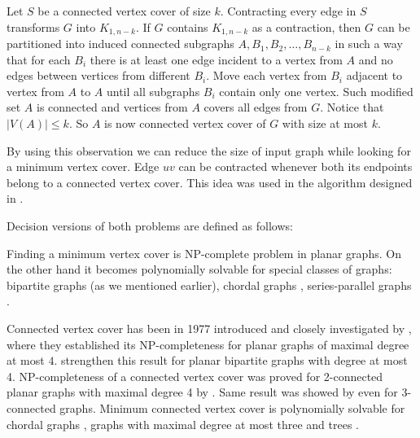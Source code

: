 \begin{myproof}
	Let \(S\) be a connected vertex cover of size \(k\). 
	Contracting every edge in \(S\) transforms \(G\) into \(K_{1, n-k}\).
	If \(G\) contains \(K_{1, n-k}\) as a contraction, then
	\(G\) can be partitioned into induced connected subgraphs \(A, B_1, B_2, \dots, B_{n-k}\)
	in such a way that for each \(B_i\) there is at least one edge incident to a vertex from \(A\)
	and no edges between vertices from different \(B_i\).
	Move each vertex from \(B_i\) adjacent to vertex from \(A\) to \(A\) until all subgraphs \(B_i\)
	contain only one vertex. Such modified set \(A\) is connected and vertices from \(A\) covers all edges from \(G\).
	Notice that \(|V(A)| \leq k\). So \(A\) is now connected vertex cover of \(G\) with size at most \(k\).
\end{myproof}
By using this observation we can reduce the size of input graph while looking for a minimum vertex cover.
Edge \(uv\) can be contracted whenever both its endpoints belong to a connected vertex cover.
This idea was used in the algorithm designed in \cite{JohnsonPaesaniPaulusma20}.

Decision versions of both problems are defined as follows:

\begin{problem}
\end{problem}

\begin{problem}
\end{problem}

Finding a minimum vertex cover is NP-complete problem in planar graphs. %
On the other hand it becomes polynomially solvable for special classes of graphs: bipartite graphs (as we mentioned earlier), 
chordal graphs \cite{Gavril74}, series-parallel graphs \cite{TakamizawaKazuhikoNishizeki82}.

Connected vertex cover has been in 1977 introduced and closely investigated by \citet{GareyJohnson77}, where they established its NP-completeness
for planar graphs of maximal degree at most \(4\).
\citet{FernauManlove09} strengthen this result for planar bipartite graphs with degree at most 4. 
NP-completeness of a connected vertex cover was proved for 2-connected planar graphs with maximal degree 4 by \citet{PriyadarsiniHemalatha08}. 
Same result was showed by \citet{WatanabeKajitaOnaga91} even for 3-connected graphs.
Minimum connected vertex cover is polynomially solvable for chordal graphs \cite{EscoffierGourv`esMonnot10}, graphs with maximal degree at most three and trees \cite{Ueno88}.

